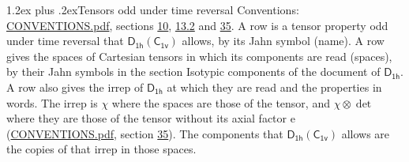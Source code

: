 \documentclass[10pt,a4paper]{article}
\makeatletter
\renewcommand\section{\@startsection{section}{1}{\z@}{-3ex plus -1ex minus -.2ex}%
  {1.2ex plus .2ex}{\normalfont\large\sffamily\bfseries\color{parttitle}}}
\numberwithin{equation}{section}
\newcommand{\grp}[1]{\mathsf{#1}}
\newcommand{\irrprod}{\otimes}
\makeatother
\begin{document}
\section{Tensors odd under time reversal}\label{s:time_odd}
Conventions: \href{../../CONVENTIONS.pdf}{CONVENTIONS.pdf}, sections \href{../../../rotation/CONVENTIONS.pdf\#conv.10}{10}, \href{../../../rotation/CONVENTIONS.pdf\#conv.13.2}{13.2} and \href{../../CONVENTIONS.pdf\#conv.35}{35}.
\leavevmode\label{n:head.name.property}A row is a tensor property odd under time reversal that $\grp{D_{1h}}(\grp{C_{1v}})$ allows, by its Jahn symbol (name). \label{n:head.spaces}A row gives the spaces of Cartesian tensors in which its components are read (spaces), by their Jahn symbols in the section Isotypic components of the document of \href{../../../rotation/data/pdf/D1h.pdf}{$\grp{D_{1h}}$}. \label{n:head.properties}A row also gives the irrep of $\grp{D_{1h}}$ at which they are read and the properties in words. The irrep is $\chi$ where the spaces are those of the tensor, and $\chi \irrprod \det$ where they are those of the tensor without its axial factor e (\href{../../CONVENTIONS.pdf}{CONVENTIONS.pdf}, section \href{../../CONVENTIONS.pdf\#conv.35}{35}). The components that $\grp{D_{1h}}(\grp{C_{1v}})$ allows are the copies of that irrep in those spaces.
\end{document}
